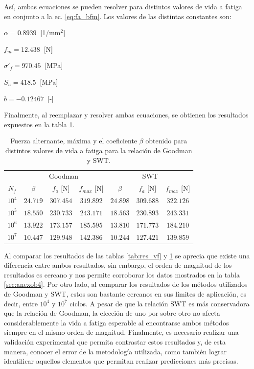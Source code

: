 Así, ambas ecuaciones se pueden resolver para distintos valores de vida a fatiga en conjunto a la ec. \ref{eq:fa_bfm}. Los valores de las distintas constantes son:
\begin{multicols}{2}
\begin{itemize*}
	\item $\alpha = 0.8939\:$ [1/mm$^2$]
	\item $f_m = 12.438\:$ [N]
	\item $\sigma'_f = 970.45\:$ [MPa]
	\item $S_u = 418.5\:$ [MPa]
	\item $b = -0.12467\:$ [-]
\end{itemize*}
\end{multicols}

Finalmente, al reemplazar y resolver ambas ecuaciones, se obtienen los resultados expuestos en la tabla \ref{tab:resfuerza_vf}.

\begin{table}[h]
\centering
\caption{Fuerza alternante, máxima y el coeficiente $\beta$ obtenido para distintos valores de vida a fatiga para la relación de Goodman y SWT.}
\begin{tabular}{@{}ccccccc@{}}
\toprule
       & \multicolumn{3}{c}{Goodman}                  & \multicolumn{3}{c}{SWT}                      \\ \cmidrule(l){2-7} 
$N_f$  & $\beta$  & $f_a$ {[}N{]} & $f_{max}$ {[}N{]} & $\beta$  & $f_a$ {[}N{]} & $f_{max}$ {[}N{]} \\ \midrule
$10^4$ & $24.719$ & $307.454$     & $319.892$         & $24.898$ & $309.688$     & $322.126$         \\
$10^5$ & $18.550$ & $230.733$     & $243.171$         & $18.563$ & $230.893$     & $243.331$         \\
$10^6$ & $13.922$ & $173.157$     & $185.595$         & $13.810$ & $171.773$     & $184.210$         \\
$10^7$ & $10.447$ & $129.948$     & $142.386$         & $10.244$ & $127.421$     & $139.859$         \\ \bottomrule
\end{tabular}
\label{tab:resfuerza_vf}
\end{table}

Al comparar los resultados de las tablas \ref{tab:res_vf} y \ref{tab:resfuerza_vf} se aprecia que existe una diferencia entre ambos resultados, sin embargo, el orden de magnitud de los resultados es cercano y nos permite corroborar los datos mostrados en la tabla \ref{sec:anexob4}. Por otro lado, al comparar los resultados de los métodos utilizados de Goodman y SWT, estos son bastante cercanos en sus límites de aplicación, es decir, entre $10^4$ y $10^7$ ciclos. A pesar de que la relación SWT es más conservadora que la relación de Goodman, la elección de uno por sobre otro no afecta considerablemente la vida a fatiga esperable al encontrarse ambos métodos siempre en el mismo orden de magnitud. Finalmente, es necesario realizar una validación experimental que permita contrastar estos resultados y, de esta manera, conocer el error de la metodología utilizada, como también lograr identificar aquellos elementos que permitan realizar predicciones más precisas.

